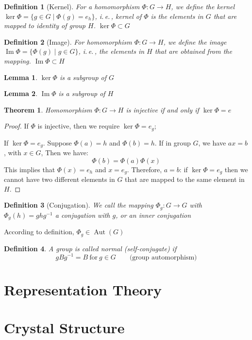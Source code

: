 \documentclass{amsart}
\newtheorem{definition}{Definition}
\newtheorem{theorem}{Theorem}
\newtheorem{lemma}{Lemma}
\DeclareMathOperator{\Aut}{Aut}
\DeclareMathOperator{\Image}{Im}
\begin{document}
\vspace{10pt}

\begin{definition}
    [Kernel] For a homomorphism $\Phi\colon G \to H$, we define the kernel $\ker\Phi = \{g\in G\mid \Phi(g) = e_h \}$, i.\,e.\,,
    kernel of $\Phi$ is the elements in $G$ that are mapped to identity of group $H$. $\ker\Phi \subset G$
\end{definition}

\begin{definition}
    [Image] For homomorphism $\Phi\colon G \to H$, we define the image $\Image\Phi = \{ \Phi(g) \mid g \in G \}$, i.\,e.\,,
    the elements in $H$ that are obtained from the mapping. $\Image\Phi \subset H$
\end{definition}

\begin{lemma}
    $\ker\Phi$ is a subgroup of $G$
\end{lemma}
\begin{lemma}
    $\Image\Phi$ is a subgroup of $H$
\end{lemma}

\vspace{10pt}

\begin{theorem}
    Homomorphism $\Phi\colon G\to H$ is injective if and only if $\ker \Phi = e$
\end{theorem}
\begin{proof}
    If $\Phi$ is injective, then we require $\ker \Phi = e_g$; 

    If $\ker \Phi = e_g$. Suppose $\Phi(a) = h$ and $\Phi(b) = h$. If in group $G$, we have $ax = b$, with $x\in G$, 
    Then we have:
    \[  
        \Phi(b) = \Phi(a)\Phi(x)    
    \]
    This implies that $\Phi(x)=e_h$ and $x = e_g$. Therefore, $a = b$: if $\ker \Phi = e_g$ then we cannot have
    two different elements in $G$ that are mapped to the same element in $H$.
\end{proof}

\vspace{10pt}

\begin{definition}
    [Conjugation]
    We call the mapping $\Phi_g\colon G\to G$ with $\Phi_g(h) = ghg^{-1}$ a conjugation with $g$, or an \emph{inner conjugation}
\end{definition}
According to definition, $\Phi_g \in \Aut(G)$


\begin{definition}
    A group is called normal (self-conjugate) if 
    \[
        gBg^{-1} = B\ \text{for}\ g \in G \qquad \text{(group automorphism)}    
    \]
\end{definition}


\vspace{10pt}

\newpage
\section{Representation Theory}

\newpage
\section{Crystal Structure}
\end{document}
